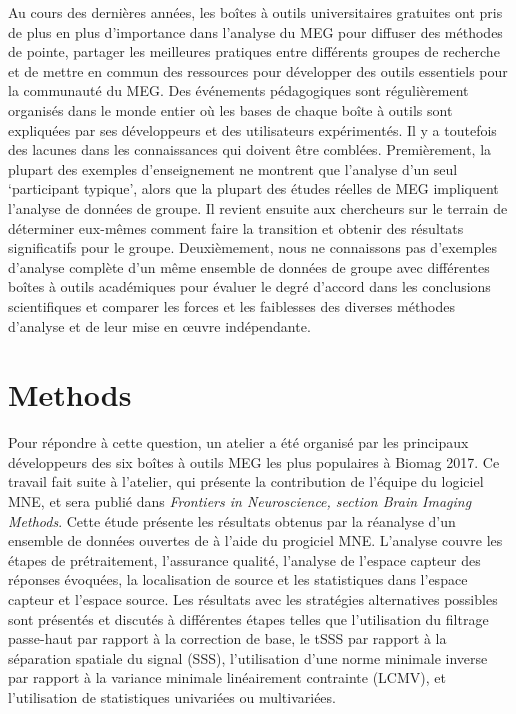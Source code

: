 Au cours des dernières années, les boîtes à outils universitaires gratuites ont pris de plus en plus d'importance dans l'analyse du MEG pour diffuser des méthodes de pointe, partager les meilleures pratiques entre différents groupes de recherche et de mettre en commun des ressources pour développer des outils essentiels pour la communauté du MEG. Des événements pédagogiques sont régulièrement organisés dans le monde entier où les bases de chaque boîte à outils sont expliquées par ses développeurs et des utilisateurs expérimentés. Il y a toutefois des lacunes dans les connaissances qui doivent être comblées. Premièrement, la plupart des exemples d'enseignement ne montrent que l'analyse d'un seul ‘participant typique’, alors que la plupart des études réelles de MEG impliquent l'analyse de données de groupe. Il revient ensuite aux chercheurs sur le terrain de déterminer eux-mêmes comment faire la transition et obtenir des résultats significatifs pour le groupe. Deuxièmement, nous ne connaissons pas d'exemples d'analyse complète d'un même ensemble de données de groupe avec différentes boîtes à outils académiques pour évaluer le degré d'accord dans les conclusions scientifiques et comparer les forces et les faiblesses des diverses méthodes d'analyse et de leur mise en œuvre indépendante.

\section*{Methods}
Pour répondre à cette question, un atelier a été organisé par les principaux développeurs des six boîtes à outils MEG les plus populaires à Biomag 2017. Ce travail fait suite à l'atelier, qui présente la contribution de l'équipe du logiciel MNE, et sera publié dans \emph{Frontiers in Neuroscience, section Brain Imaging Methods}. Cette étude présente les résultats obtenus par la réanalyse d'un ensemble de données ouvertes de \citet{wakeman2015multi} à l'aide du progiciel MNE. L'analyse couvre les étapes de prétraitement, l'assurance qualité, l'analyse de l'espace capteur des réponses évoquées, la localisation de source et les statistiques dans l'espace capteur et l'espace source. Les résultats avec les stratégies alternatives possibles sont présentés et discutés à différentes étapes telles que l'utilisation du filtrage passe-haut par rapport à la correction de base, le tSSS par rapport à la séparation spatiale du signal (SSS), l'utilisation d'une norme minimale inverse par rapport à la variance minimale linéairement contrainte (LCMV), et l'utilisation de statistiques univariées ou multivariées.

